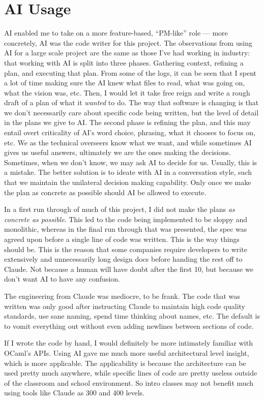 \documentclass[sigconf]{acmart}
\begin{document}
\section{AI Usage}
AI enabled me to take on a more feature-based, ``PM-like'' role --- more concretely, AI was the code writer for this project. The observations from using AI for a large scale project are the same as those I've had working in industry: that working with AI is split into three phases. Gathering context, refining a plan, and executing that plan. From some of the logs, it can be seen that I spent a lot of time making sure the AI knew what files to read, what was going on, what the vision was, etc. Then, I would let it take free reign and write a rough draft of a plan of what it \textit{wanted} to do. The way that software is changing is that we don't necessarily care about specific code being written, but the level of detail in the plans we give to AI. The second phase is refining the plan, and this may entail overt criticality of AI's word choice, phrasing, what it chooses to focus on, etc. We as the technical overseers know what we want, and while sometimes AI gives us useful answers, ultimately we are the ones making the decisions. Sometimes, when we don't know, we may ask AI to decide for us. Usually, this is a mistake. The better solution is to ideate with AI in a conversation style, such that we maintain the unilateral decision making capability. Only once we make the plan as concrete as possible should AI be allowed to execute.

In a first run through of much of this project, I did not make the plans \textit{as concrete as possible}. This led to the code being implemented to be sloppy and monolithic, whereas in the final run through that was presented, the spec was agreed upon before a single line of code was written. This is the way things should be. This is the reason that some companies require developers to write extensively and unnecessarily long design docs before handing the rest off to Claude. Not because a human will have doubt after the first 10, but because we don't want AI to have any confusion.

The engineering from Claude was mediocre, to be frank. The code that was written was only good after instructing Claude to maintain high code quality standards, use sane naming, spend time thinking about names, etc. The default is to vomit everything out without even adding newlines between sections of code.

If I wrote the code by hand, I would definitely be more intimately familiar with OCaml's APIs. Using AI gave me much more useful architectural level insight, which is more applicable. The applicability is because the architecture can be used pretty much anywhere, while specific lines of code are pretty useless outside of the classroom and school environment. So intro classes may not benefit much using tools like Claude as 300 and 400 levels.
\end{document}
